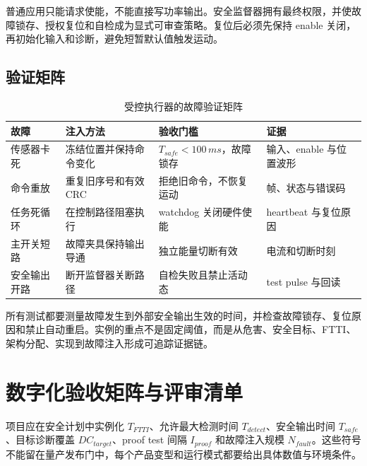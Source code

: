 普通应用只能请求使能，不能直接写功率输出。安全监督器拥有最终权限，并使故障锁存、授权复位和自检成为显式可审查策略。复位后必须先保持 enable 关闭，再初始化输入和诊断，避免短暂默认值触发运动。

\subsection{验证矩阵}

\begin{table}[H]
  \centering
  \caption{受控执行器的故障验证矩阵}
  \begin{tabular}{p{27mm}p{39mm}p{39mm}p{29mm}}
    \hline
    故障 & 注入方法 & 验收门槛 & 证据 \\
    \hline
    传感器卡死 & 冻结位置并保持命令变化 & $T_{safe}<100\,ms$，故障锁存 & 输入、enable 与位置波形 \\
    命令重放 & 重复旧序号和有效 CRC & 拒绝旧命令，不恢复运动 & 帧、状态与错误码 \\
    任务死循环 & 在控制路径阻塞执行 & watchdog 关闭硬件使能 & heartbeat 与复位原因 \\
    主开关短路 & 故障夹具保持输出导通 & 独立能量切断有效 & 电流和切断时刻 \\
    安全输出开路 & 断开监督器关断路径 & 自检失败且禁止活动态 & test pulse 与回读 \\
    \hline
  \end{tabular}
\end{table}

所有测试都要测量故障发生到外部安全输出生效的时间，并检查故障锁存、复位原因和禁止自动重启。实例的重点不是固定阈值，而是从危害、安全目标、FTTI、架构分配、实现到故障注入形成可追踪证据链。

\section{数字化验收矩阵与评审清单}

项目应在安全计划中实例化 $T_{FTTI}$、允许最大检测时间 $T_{detect}$、安全输出时间 $T_{safe}$、目标诊断覆盖 $DC_{target}$、proof test 间隔 $I_{proof}$ 和故障注入规模 $N_{fault}$。这些符号不能留在量产发布门中，每个产品变型和运行模式都要给出具体数值与环境条件。

